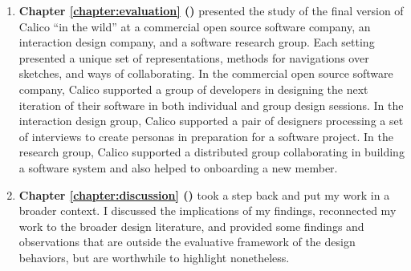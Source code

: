 \documentclass[12pt,fleqn]{ucithesis}
\begin{document}
\begin{enumerate}
   \item \textbf{Chapter \ref{chapter:evaluation} ()} presented the study of the final version of Calico ``in the wild'' at a commercial open source software company, an interaction design company, and a software research group. Each setting presented a unique set of representations, methods for navigations over sketches, and ways of collaborating. In the commercial open source software company, Calico supported a group of developers in designing the next iteration of their software in both individual and group design sessions. In the interaction design group, Calico supported a pair of designers processing a set of interviews to create personas in preparation for a software project. In the research group, Calico supported a distributed group collaborating in building a software system and also helped to onboarding a new member.

   \item \textbf{Chapter \ref{chapter:discussion} ()} took a step back and put my work in a broader context. I discussed the implications of my findings, reconnected my work to the broader design literature, and provided some findings and observations that are outside the evaluative framework of the design behaviors, but are worthwhile to highlight nonetheless. 




\end{enumerate}
\end{document}
